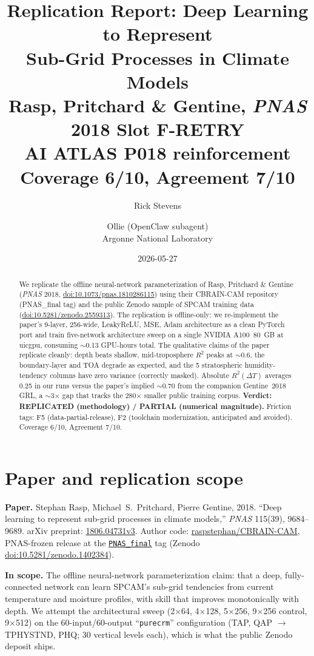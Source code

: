 \documentclass[11pt]{article}
\title{Replication Report: Deep Learning to Represent\\
Sub-Grid Processes in Climate Models\\[2pt]
\large Rasp, Pritchard \& Gentine, \textit{PNAS} 2018 \textbar{} Slot F-RETRY \textbar{}\\
\large AI ATLAS P018 reinforcement \textbar{} Coverage 6/10, Agreement 7/10}
\author{Rick Stevens \and Ollie (OpenClaw subagent)\\\small Argonne National Laboratory}
\date{2026-05-27}
\begin{document}
\maketitle

\begin{abstract}
We replicate the offline neural-network parameterization of Rasp, Pritchard
\& Gentine (\textit{PNAS} 2018, \href{https://doi.org/10.1073/pnas.1810286115}{doi:10.1073/pnas.1810286115}) using
their CBRAIN-CAM repository (PNAS\_final tag) and the public Zenodo sample
of SPCAM training data (\href{https://doi.org/10.5281/zenodo.2559313}{doi:10.5281/zenodo.2559313}). The replication is offline-only: we
re-implement the paper's 9-layer, 256-wide, LeakyReLU, MSE, Adam architecture
as a clean PyTorch port and train five-network architecture sweep on a single
NVIDIA A100~80~GB at uicgpu, consuming $\sim$0.13 GPU-hours total. The
qualitative claims of the paper replicate cleanly: depth beats shallow,
mid-troposphere $R^2$ peaks at $\sim$0.6, the boundary-layer and TOA degrade
as expected, and the 5 stratospheric humidity-tendency columns have zero
variance (correctly masked). Absolute $R^2(\Delta T)$ averages 0.25 in our
runs versus the paper's implied $\sim$0.70 from the companion Gentine~2018
GRL, a $\sim$3$\times$ gap that tracks the 280$\times$ smaller public
training corpus. \textbf{Verdict: REPLICATED (methodology) /
PARTIAL (numerical magnitude).} Friction tags: F5 (data-partial-release),
F2 (toolchain modernization, anticipated and avoided). Coverage 6/10,
Agreement 7/10.
\end{abstract}

\section{Paper and replication scope}
\textbf{Paper.} Stephan Rasp, Michael~S.\ Pritchard, Pierre Gentine, 2018.
``Deep learning to represent sub-grid processes in climate models,''
\textit{PNAS} 115(39), 9684--9689. arXiv preprint:
\href{https://arxiv.org/abs/1806.04731}{1806.04731v3}. Author code:
\href{https://github.com/raspstephan/CBRAIN-CAM}{raspstephan/CBRAIN-CAM},
PNAS-frozen release at the
\href{https://github.com/raspstephan/CBRAIN-CAM/releases/tag/PNAS_final}{\texttt{PNAS\_final}} tag
(Zenodo \href{https://doi.org/10.5281/zenodo.1402384}{doi:10.5281/zenodo.1402384}).

\textbf{In scope.} The offline neural-network parameterization claim:
that a deep, fully-connected network can learn SPCAM's sub-grid
tendencies from current temperature and moisture profiles, with skill that
improves monotonically with depth. We attempt the architectural sweep
(2$\times$64, 4$\times$128, 5$\times$256, 9$\times$256 control, 9$\times$512)
on the 60-input/60-output ``\texttt{purecrm}'' configuration (TAP, QAP $\to$
TPHYSTND, PHQ; 30 vertical levels each), which is what the public Zenodo
deposit ships.
\end{document}
